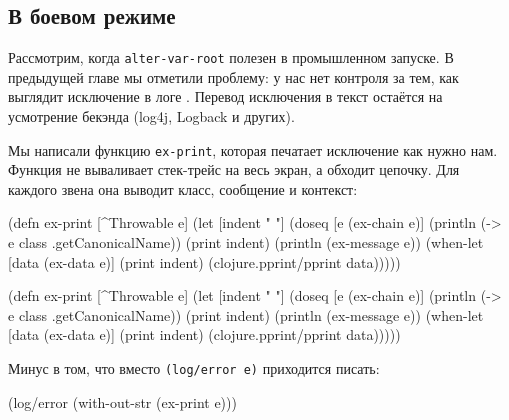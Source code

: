 \subsection{В боевом режиме}

\label{install-logger}


Рассмотрим, когда \verb|alter-var-root| полезен в промышленном запуске. В
предыдущей главе мы отметили проблему: у нас нет контроля за тем, как выглядит
исключение в логе . Перевод исключения в текст остаётся на
усмотрение бекэнда (log4j, Logback и других).

Мы написали функцию \verb|ex-print|, которая печатает исключение как нужно
нам. Функция не вываливает стек-трейс на весь экран, а обходит цепочку. Для
каждого звена она выводит класс, сообщение и контекст:

\ifx\DEVICETYPE\MOBILE

\begin{english}
  \begin{clojure}
(defn ex-print
  [^Throwable e]
  (let [indent "  "]
    (doseq [e (ex-chain e)]
      (println (-> e
                   class
                   .getCanonicalName))
      (print indent)
      (println (ex-message e))
      (when-let [data (ex-data e)]
        (print indent)
        (clojure.pprint/pprint data)))))
  \end{clojure}
\end{english}

\else

\begin{english}
  \begin{clojure}
(defn ex-print
  [^Throwable e]
  (let [indent "  "]
    (doseq [e (ex-chain e)]
      (println (-> e class .getCanonicalName))
      (print indent)
      (println (ex-message e))
      (when-let [data (ex-data e)]
        (print indent)
        (clojure.pprint/pprint data)))))
  \end{clojure}
\end{english}

\fi

\noindent
Минус в том, что вместо \verb|(log/error e)| приходится писать:

\begin{english}
  \begin{clojure}
(log/error (with-out-str (ex-print e)))
  \end{clojure}
\end{english}

